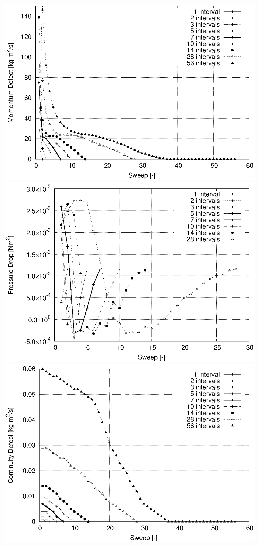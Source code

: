 \documentclass[twoside,a4paper,12pt,bibliography=totoc, parskip=half,english]{scrreprt}
\begin{document}
\includegraphics[scale=1]{13_adjoint_modef_newton.eps}
\includegraphics[scale=1]{12_adjoint_modef_newton.eps}
\includegraphics[scale=1]{14_adjoint_modef_newton.eps}
\end{document}
